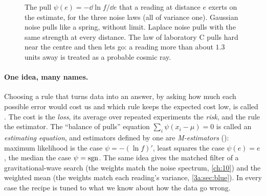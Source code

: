 \begin{figure}[htbp]
\centering
{}
\caption{The pull $\psi(e)=-\dd\ln f/\dd e$ that a reading at distance $e$
exerts on the estimate, for the three noise laws (all of variance one).
Gaussian noise pulls like a spring, without limit. Laplace noise pulls with
the same strength at every distance. The law of laboratory C pulls hard near
the centre and then lets go: a reading more than about $1.3$ units away is
treated as a probable cosmic ray.}
\label{T5a:fig:pull}
\end{figure}

\paragraph{One idea, many names.}
Choosing a rule that turns data into an answer, by asking how much each
possible error would cost us and which rule keeps the expected cost low, is
called  . The cost is
the \emph{loss}, its average over repeated experiments the \emph{risk}, and
the rule the estimator. The ``balance of pulls'' equation
$\sum_i\psi(x_i-\mu)=0$ is called an \emph{estimating equation}, and
estimators defined by one are \emph{M-estimators}
(): maximum likelihood is the case
$\psi=-(\ln f)'$, least squares the case $\psi(e)=e$, the median the case
$\psi=\operatorname{sgn}$. The same idea gives the matched filter of a gravitational-wave
search (the weights match the noise spectrum, \cref{ch:10}) and the
weighted mean (the weights match each reading's variance,
\cref{3a:sec:blue}). In every case the recipe is tuned to what we know about
how the data go wrong.

